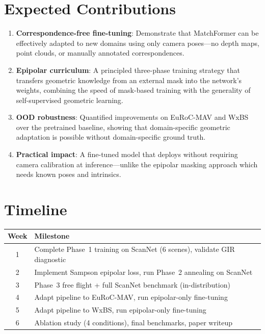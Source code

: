 \documentclass[11pt,a4paper]{article}
\begin{document}
\section{Expected Contributions}

\begin{enumerate}[leftmargin=*]
    \item \textbf{Correspondence-free fine-tuning}: Demonstrate that MatchFormer can be effectively adapted to new domains using only camera poses---no depth maps, point clouds, or manually annotated correspondences.

    \item \textbf{Epipolar curriculum}: A principled three-phase training strategy that transfers geometric knowledge from an external mask into the network's weights, combining the speed of mask-based training with the generality of self-supervised geometric learning.

    \item \textbf{OOD robustness}: Quantified improvements on EuRoC-MAV and WxBS over the pretrained baseline, showing that domain-specific geometric adaptation is possible without domain-specific ground truth.

    \item \textbf{Practical impact}: A fine-tuned model that deploys without requiring camera calibration at inference---unlike the epipolar masking approach which needs known poses and intrinsics.
\end{enumerate}

\section{Timeline}

\begin{table}[h]
\centering
\begin{tabular}{cl}
\toprule
\textbf{Week} & \textbf{Milestone} \\
\midrule
1 & Complete Phase~1 training on ScanNet (6 scenes), validate GIR diagnostic \\
2 & Implement Sampson epipolar loss, run Phase~2 annealing on ScanNet \\
3 & Phase~3 free flight + full ScanNet benchmark (in-distribution) \\
4 & Adapt pipeline to EuRoC-MAV, run epipolar-only fine-tuning \\
5 & Adapt pipeline to WxBS, run epipolar-only fine-tuning \\
6 & Ablation study (4 conditions), final benchmarks, paper writeup \\
\bottomrule
\end{tabular}
\end{table}
\end{document}
